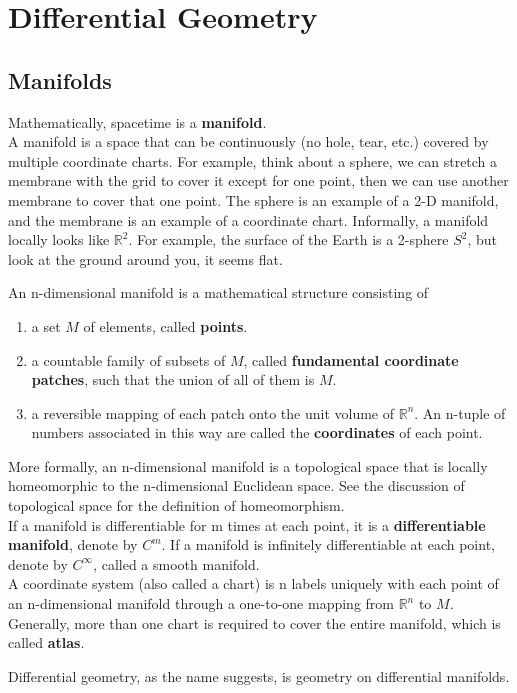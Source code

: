 \documentclass[12pt]{article}
\theoremstyle{mystyle}{\newtheorem{definition}{Definition}[section]}
\theoremstyle{mystyle}{\newtheorem{theorem}[definition]{Theorem}}
\theoremstyle{mystyle}{\newtheorem*{remark}{Remark}}
\theoremstyle{mystyle}{\newtheorem*{example}{Example}}
\theoremstyle{mystyle}{\newtheorem*{examples}{Examples}}
\theoremstyle{cstyle}{\newtheorem*{cthm}{}}
\begin{document}
\newpage

\section{Differential Geometry}

\subsection{Manifolds}
Mathematically, spacetime is a \textbf{manifold}.\\
A manifold is a space that can be continuously (no hole, tear, etc.) covered by multiple coordinate charts.
For example, think about a sphere, we can stretch a membrane with the grid to cover it except for one point, then we can
use another membrane to cover that one point. The sphere is an example of a 2-D manifold, and the membrane is an example of a coordinate chart.
Informally, a manifold locally looks like \(\mathbb{R}^2\).
For example, the surface of the Earth is a 2-sphere $S^2$, but look at the ground around you, it seems flat.
\begin{definition}
  An n-dimensional manifold is a mathematical structure consisting of
  \begin{enumerate}
    \item a set \(M\) of elements, called \textbf{points}.
    \item a countable family of subsets of \(M\), called \textbf{fundamental coordinate patches},
          such that the union of all of them is \(M\).
    \item a reversible mapping of each patch onto the unit volume of \(\mathbb{R}^n\). An n-tuple of numbers associated
          in this way are called the \textbf{coordinates} of each point.
  \end{enumerate}
  More formally, an n-dimensional manifold is a topological space that is locally homeomorphic to the n-dimensional Euclidean space.
  See the discussion of topological space for the definition of homeomorphism.\\
  If a manifold is differentiable for m times at each point, it is a \textbf{differentiable manifold}, denote by \(C^m\).
  If a manifold is infinitely differentiable at each point, denote by \(C^\infty\), called a smooth manifold.\\
  A coordinate system (also called a chart) is n labels uniquely with each point of an n-dimensional manifold through a one-to-one mapping from
  $\mathbb{R}^n$ to $M$.\\
  Generally, more than one chart is required to cover the entire manifold, which is called \textbf{atlas}.
\end{definition}
Differential geometry, as the name suggests, is geometry on differential manifolds.
\end{document}
